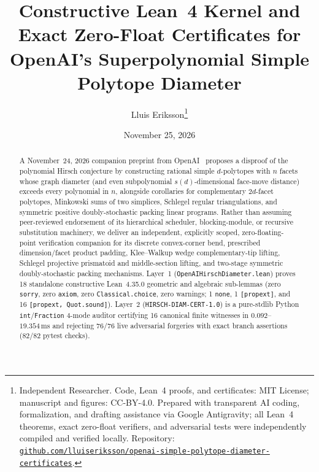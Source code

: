 \documentclass[10pt,twocolumn]{article}
\title{\vspace{-0.9em}\textbf{Constructive Lean~4 Kernel and Exact Zero-Float Certificates for OpenAI's Superpolynomial Simple Polytope Diameter}}
\author{Lluis Eriksson\thanks{Independent Researcher. Code, Lean~4 proofs, and certificates: MIT License; manuscript and figures: CC-BY-4.0. Prepared with transparent AI coding, formalization, and drafting assistance via Google Antigravity; all Lean~4 theorems, exact zero-float verifiers, and adversarial tests were independently compiled and verified locally. Repository: \href{https://github.com/lluiseriksson/openai-simple-polytope-diameter-certificates}{\nolinkurl{github.com/lluiseriksson/openai-simple-polytope-diameter-certificates}}.}}
\date{November 25, 2026}
\begin{document}
\maketitle
\vspace{-1.2em}

\begin{abstract}
A November~24, 2026 companion preprint from OpenAI~\cite{openai2026hirsch} proposes a disproof of the polynomial Hirsch conjecture by constructing rational simple $d$-polytopes with $n$ facets whose graph diameter (and even subpolynomial $s(d)$-dimensional face-move distance) exceeds every polynomial in $n$, alongside corollaries for complementary $2d$-facet polytopes, Minkowski sums of two simplices, Schlegel regular triangulations, and symmetric positive doubly-stochastic packing linear programs. Rather than assuming peer-reviewed endorsement of its hierarchical scheduler, blocking-module, or recursive substitution machinery, we deliver an independent, explicitly scoped, zero-floating-point verification companion for its discrete convex-corner bend, prescribed dimension/facet product padding, Klee--Walkup wedge complementary-tip lifting, Schlegel projective prismatoid and middle-section lifting, and two-stage symmetric doubly-stochastic packing mechanisms. Layer~1 (\texttt{OpenAI\allowbreak HirschDiameter.lean}) proves 18 standalone constructive Lean~4.35.0 geometric and algebraic sub-lemmas (zero \texttt{sorry}, zero \texttt{axiom}, zero \texttt{Classical.choice}, zero warnings; 1 \texttt{none}, 1 \texttt{[propext]}, and 16 \texttt{[propext, Quot.sound]}). Layer~2 (\texttt{HIRSCH-DIAM-CERT-1.0}) is a pure-stdlib Python \texttt{int}/\texttt{Fraction} 4-mode auditor certifying 16 canonical finite witnesses in $0.092$--$19.354\,\mathrm{ms}$ and rejecting 76/76 live adversarial forgeries with exact branch assertions (82/82 pytest checks).
\end{abstract}
\end{document}
